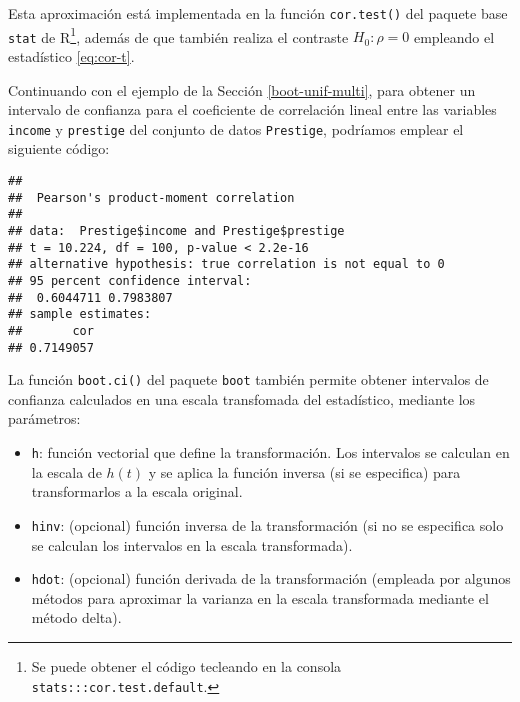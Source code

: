 \documentclass[
]{book}
\newenvironment{Shaded}{\begin{snugshade}}{\end{snugshade}}
\newcommand{\AttributeTok}[1]{\textcolor[rgb]{0.77,0.63,0.00}{#1}}
\newcommand{\CommentTok}[1]{\textcolor[rgb]{0.56,0.35,0.01}{\textit{#1}}}
\newcommand{\FunctionTok}[1]{\textcolor[rgb]{0.00,0.00,0.00}{#1}}
\newcommand{\NormalTok}[1]{#1}
\newcommand{\SpecialCharTok}[1]{\textcolor[rgb]{0.00,0.00,0.00}{#1}}
\newcommand{\StringTok}[1]{\textcolor[rgb]{0.31,0.60,0.02}{#1}}
\theoremstyle{break}
\theoremstyle{definition}
\theoremstyle{definition}
\theoremstyle{definition}
\theoremstyle{definition}
\theoremstyle{remark}
\begin{document}
Esta aproximación está implementada en la función \texttt{cor.test()} del paquete base \texttt{stat} de R\footnote{Se puede obtener el código tecleando en la consola \texttt{stats:::cor.test.default}.}, además de que también realiza el contraste \(H_0: \rho = 0\) empleando el estadístico \eqref{eq:cor-t}.

Continuando con el ejemplo de la Sección \ref{boot-unif-multi}, para obtener un intervalo de confianza para el coeficiente de correlación lineal entre las variables \texttt{income} y \texttt{prestige} del conjunto de datos \texttt{Prestige}, podríamos emplear el siguiente código:

\begin{Shaded}
\end{Shaded}

\begin{verbatim}
## 
##  Pearson's product-moment correlation
## 
## data:  Prestige$income and Prestige$prestige
## t = 10.224, df = 100, p-value < 2.2e-16
## alternative hypothesis: true correlation is not equal to 0
## 95 percent confidence interval:
##  0.6044711 0.7983807
## sample estimates:
##       cor 
## 0.7149057
\end{verbatim}

La función \texttt{boot.ci()} del paquete \texttt{boot} también permite obtener intervalos de confianza calculados en una escala transfomada del estadístico,
mediante los parámetros:

\begin{itemize}
\item
  \texttt{h}: función vectorial que define la transformación.
  Los intervalos se calculan en la escala de \(h(t)\) y se aplica la función inversa (si se especifica) para transformarlos a la escala original.
\item
  \texttt{hinv}: (opcional) función inversa de la transformación
  (si no se especifica solo se calculan los intervalos en la escala transformada).
\item
  \texttt{hdot}: (opcional) función derivada de la transformación
  (empleada por algunos métodos para aproximar la varianza en la escala transformada mediante el método delta).
\end{itemize}
\end{document}

